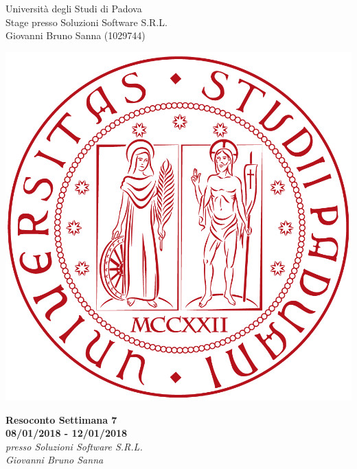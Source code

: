 \documentclass[11pt,notitlepage]{article}
\makeatletter
\newcommand{\nomeStudente}{Giovanni Bruno}
\newcommand{\cognomeStudente}{Sanna}
\newcommand{\matricolaStudente}{1029744}
\newcommand{\emailStudente}{giovannibruno.sanna@studenti.unipd.it}
\newcommand{\telStudente}{+39 0000000000}
\newcommand{\nomeTutorAziendale}{Nome}
\newcommand{\cognomeTutorAziendale}{Cognome}
\newcommand{\emailTutorAziendale}{xxtutor@azienda.it}
\newcommand{\telTutorAziendale}{+39 0000000000}
\newcommand{\ragioneSocAzienda}{Soluzioni Software S.R.L.}
\newcommand{\indirizzoAzienda}{Via Via dei Ronchi, 21, 35127 Padova (PD)}
\newcommand{\sitoAzienda}{http://www.soluzioni-sw.it/}
\makeatother
\begin{document}
	
\noindent
\parbox{0.7\columnwidth}{Università degli Studi di Padova\\
	Stage presso \ragioneSocAzienda{}\\
	\nomeStudente{} \cognomeStudente{} (\matricolaStudente{})}%
\parbox{0.3\columnwidth}{
	\hfill \includegraphics[scale=0.08]{immagini/logo-unipd.png}}

\bigskip
\begin{center}
{\Huge \textbf{Resoconto Settimana 7}} \\ 
{\textbf{08/01/2018 - 12/01/2018}} \\ \bigskip
	{\Large \textit{presso \ragioneSocAzienda{}}}\\ \bigskip
	{\Large \textit{\nomeStudente{} \cognomeStudente{}}}
\end{center}

\end{document}
